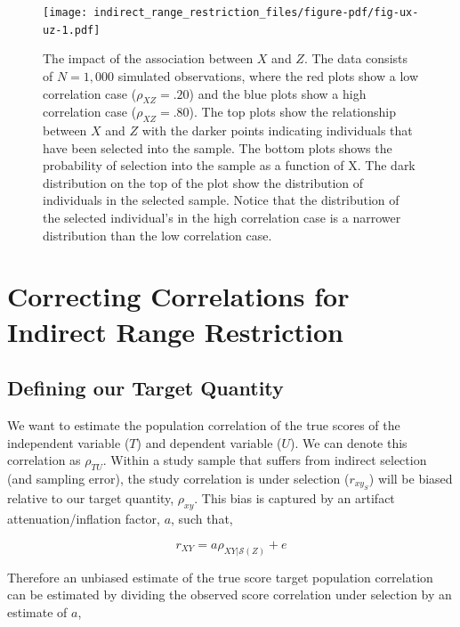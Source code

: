 \documentclass[
  letterpaper,
  DIV=11,
  numbers=noendperiod]{scrreprt}
\begin{document}
\begin{figure}[H]

{\centering \texttt{[image: indirect\_range\_restriction\_files/figure-pdf/fig-ux-uz-1.pdf]}

}

\caption{\label{fig-ux-uz}The impact of the association between \(X\)
and \(Z\). The data consists of \(N=1,000\) simulated observations,
where the red plots show a low correlation case (\(\rho_{XZ}=.20\)) and
the blue plots show a high correlation case (\(\rho_{XZ}=.80\)). The top
plots show the relationship between \(X\) and \(Z\) with the darker
points indicating individuals that have been selected into the sample.
The bottom plots shows the probability of selection into the sample as a
function of X. The dark distribution on the top of the plot show the
distribution of individuals in the selected sample. Notice that the
distribution of the selected individual's in the high correlation case
is a narrower distribution than the low correlation case.}

\end{figure}

\hypertarget{correcting-correlations-for-indirect-range-restriction}{%
\section{Correcting Correlations for Indirect Range
Restriction}\label{correcting-correlations-for-indirect-range-restriction}}

\hypertarget{defining-our-target-quantity-6}{%
\subsection{Defining our Target
Quantity}\label{defining-our-target-quantity-6}}

We want to estimate the population correlation of the true scores of the
independent variable (\(T\)) and dependent variable (\(U\)). We can
denote this correlation as \(\rho_{TU}\). Within a study sample that
suffers from indirect selection (and sampling error), the study
correlation is under selection (\(r_{xy_S}\)) will be biased relative to
our target quantity, \(\rho_{xy}\). This bias is captured by an artifact
attenuation/inflation factor, \(a\), such that,

\[
r_{XY} = a \rho_{XY|\mathcal{S}(Z)} + e 
\]

Therefore an unbiased estimate of the true score target population
correlation can be estimated by dividing the observed score correlation
under selection by an estimate of \(a\),
\end{document}
